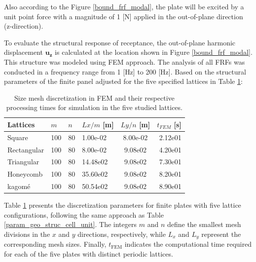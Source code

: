 \documentclass[review,numbers,sort&compress]{elsarticle}
\begin{document}
{Also according to the Figure \ref{bound_frf_modal}, the plate will be excited by a unit point force with a magnitude of 1 [N] applied in the out-of-plane direction (z-direction). 

To evaluate the structural response of receptance, the out-of-plane harmonic displacement $\mathbf{u_z}$ is calculated at the location shown in Figure \ref{bound_frf_modal}. This structure was modeled using FEM approach. The analysis of all FRFs was conducted in a frequency range from 1 [Hz] to 200 [Hz]. 
Based on the structural parameters of the finite panel adjusted for the five specified lattices in Table \ref{panel_param_latt}:

\begin{table}[htb]
	\centering
	\caption{Size mesh discretization in FEM and their respective processing times for simulation in the five studied lattices\protect\footnotemark.}
	\label{panel_param_latt}
	\begin{tabular}{llllcr}
		\hline
		Lattices \hspace{1 mm}  & $m$ \hspace{1 mm}& $n$ \hspace{1 mm}&  $Lx/m$ [m] \hspace{1 mm} & $Ly/n$ [m] \hspace{1 mm} &  $t_{FEM}$ [s]\hspace{1 mm}  \\
		\hline
		Square      & 100 &    80  &    1.00e-02  &    8.00e-02 &   2.12e01 \\
		Rectangular & 100 &    80  &    8.00e-02  &    9.08e02 &   4.20e01 \\
		Triangular  & 100 &    80  &    14.48e02 &     9.08e02 &   7.30e01 \\
		Honeycomb   & 100 &    80  &    35.60e02 &     9.08e02 &   8.20e01 \\
		kagomé      & 100 &    80  &    50.54e02 &     9.08e02 &   8.90e01  \\ 
		\hline
	\end{tabular}
\end{table}
Table \ref{panel_param_latt} presents the discretization parameters for finite plates with five lattice configurations, following the same approach as Table \ref{param_geo_struc_cell_unit}. The integers \( m \) and \( n \) define the smallest mesh divisions in the \( x \) and \( y \) directions, respectively, while \( L_x \) and \( L_y \) represent the corresponding mesh sizes. Finally, \( t_{\text{FEM}} \) indicates the computational time required for each of the five plates with distinct periodic lattices.
}
\end{document}
